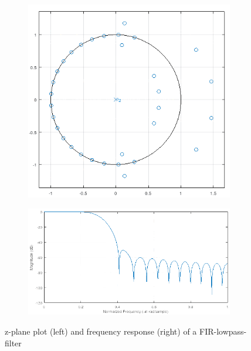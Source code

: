 \begin{figure}[!h]
    \begin{subfigure}[c]{0.35\textwidth}
        \centering
        \includegraphics[width=\textwidth]{img/fir-zplane.png}
    \end{subfigure}
    \begin{subfigure}[c]{0.65\textwidth}
        \centering
        \includegraphics[width=\textwidth]{img/fir-freq.png}
    \end{subfigure}
    \caption{z-plane plot (left) and frequency response (right) of a \ac{FIR}-lowpass-filter}
    \label{fig:FIR-z-plane-and-freq}
\end{figure}


